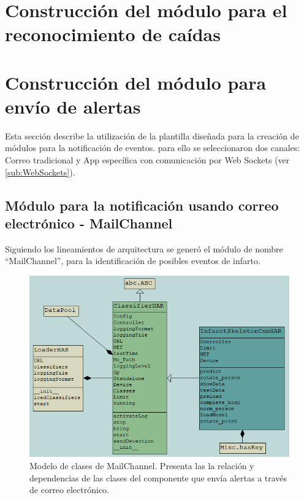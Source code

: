         
\newpage

\section{Construcción del módulo para el reconocimiento de caídas}
\label{Sec:fallDetectModule}
\newpage

\section{Construcción del módulo para envío de alertas}
\label{Sec:AlertModule}
    Esta sección describe la utilización de la plantilla diseñada para la creación de módulos para la notificación de eventos. para ello se seleccionaron dos canales: Correo tradicional y App específica con comunicación por Web Sockets (ver \ref{sub:WebSockets}).
    
    \subsection{Módulo para la notificación usando correo electrónico - MailChannel}
    \label{sub:MailChannelComponnent}
        
        Siguiendo los lineamientos de arquitectura se generó el módulo de nombre ``MailChannel'', para la identificación de posibles eventos de infarto.
        
        \begin{figure}[ht!]
        	\centering
        	\includegraphics[width=0.9\linewidth]{imgs/04-Construction/04-HarClassModel.PNG}
        	\caption[Modelo de clases de MailChannel]{Modelo de clases de MailChannel. Presenta las la relación y dependencias de las clases del componente que envía alertas a través de correo electrónico.}
    	    \label{fig:MailChannelClassModel}
        \end{figure}%
        
